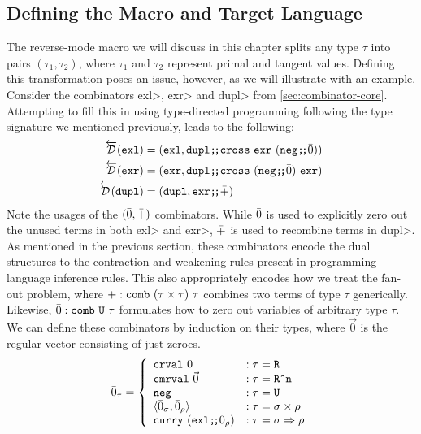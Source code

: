 \subsection{Defining the Macro and Target Language}\label{sec:combinator-macro}
  The reverse-mode macro we will discuss in this chapter splits any type $\tau$ into pairs $(\tau_1, \tau_2)$, where $\tau_1$ and $\tau_2$ represent primal and tangent values.
  Defining this transformation poses an issue, however, as we will illustrate with an example.
  Consider the combinators \<exl>, \<exr> and \<dupl> from \cref{sec:combinator-core}.
  Attempting to fill this in using type-directed programming following the type signature we mentioned previously, leads to the following:
  \begin{align*}
    \overleftarrow{\mathcal{D}}(\texttt{exl}) &= (\texttt{exl}, \texttt{dupl} \texttt{;\!;} \texttt{cross}\ \texttt{exr}\ (\texttt{neg} \texttt{;\!;} \bar{0})) \\
    \overleftarrow{\mathcal{D}}(\texttt{exr}) &= (\texttt{exr}, \texttt{dupl} \texttt{;\!;} \texttt{cross}\ (\texttt{neg} \texttt{;\!;} \bar{0})\ \texttt{exr}) \\
    \overleftarrow{\mathcal{D}}(\texttt{dupl}) &= (\texttt{dupl}, \texttt{exr} \texttt{;\!;} \bar{+})
  \end{align*}
  Note the usages of the $(\bar{0}, \bar{+})$ combinators.
  While $\bar{0}$ is used to explicitly zero out the unused terms in both \<exl> and \<exr>, $\bar{+}$ is used to recombine terms in \<dupl>.
  As mentioned in the previous section, these combinators encode the dual structures to the contraction and weakening rules present in programming language inference rules.
  This also appropriately encodes how we treat the fan-out problem, where $\bar{+} : \texttt{comb}\ (\tau \times \tau)\ \tau$ combines two terms of type $\tau$ generically.
  Likewise, $\bar{0} : \texttt{comb}\ \texttt{U}\ \tau$ formulates how to zero out variables of arbitrary type $\tau$.
  We can define these combinators by induction on their types, where $\vec{0}$ is the regular vector consisting of just zeroes.
  \begin{align*}
    \bar{0}_\tau =
      \left\{
        \begin{array}{ll}
          \texttt{crval}\ 0 & : \tau = \texttt{R} \\
          \texttt{cmrval}\ \vec{0} & : \tau = \texttt{R\^{}n} \\
          \texttt{neg} & : \tau = \texttt{U} \\
          \langle \bar{0}_\sigma, \bar{0}_\rho \rangle & : \tau = \sigma \times \rho \\
          \texttt{curry}\ (\texttt{exl} \texttt{;\!;} \bar{0}_\rho) & : \tau = \sigma \Rightarrow \rho \\
        \end{array}
      \right.
  \end{align*}
